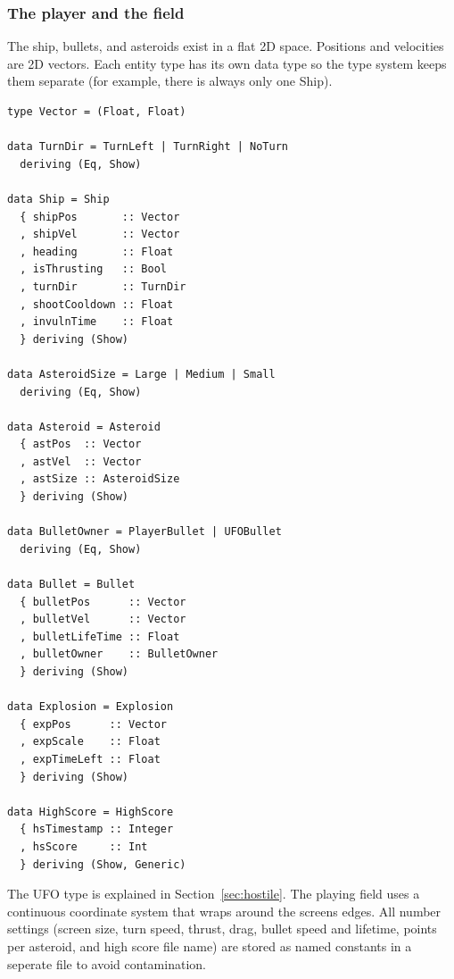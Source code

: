 \documentclass{article}
\begin{document}
\subsubsection{The player and the field}
The ship, bullets, and asteroids exist in a flat 2D space. Positions and velocities are 2D vectors. Each entity type has its own data type so the type system keeps them separate (for example, there is always only one Ship).
\begin{lstlisting}
type Vector = (Float, Float)

data TurnDir = TurnLeft | TurnRight | NoTurn
  deriving (Eq, Show)

data Ship = Ship
  { shipPos       :: Vector
  , shipVel       :: Vector
  , heading       :: Float
  , isThrusting   :: Bool
  , turnDir       :: TurnDir
  , shootCooldown :: Float
  , invulnTime    :: Float
  } deriving (Show)

data AsteroidSize = Large | Medium | Small
  deriving (Eq, Show)

data Asteroid = Asteroid
  { astPos  :: Vector
  , astVel  :: Vector
  , astSize :: AsteroidSize
  } deriving (Show)

data BulletOwner = PlayerBullet | UFOBullet
  deriving (Eq, Show)

data Bullet = Bullet
  { bulletPos      :: Vector
  , bulletVel      :: Vector
  , bulletLifeTime :: Float
  , bulletOwner    :: BulletOwner
  } deriving (Show)

data Explosion = Explosion
  { expPos      :: Vector
  , expScale    :: Float
  , expTimeLeft :: Float
  } deriving (Show)

data HighScore = HighScore
  { hsTimestamp :: Integer
  , hsScore     :: Int
  } deriving (Show, Generic)
\end{lstlisting}
The UFO type is explained in Section~\ref{sec:hostile}. The playing field uses a continuous coordinate system that wraps around the screens edges. All number settings (screen size, turn speed, thrust, drag, bullet speed and lifetime, points per asteroid, and high score file name) are stored as named constants in a seperate file to avoid contamination.
\end{document}
